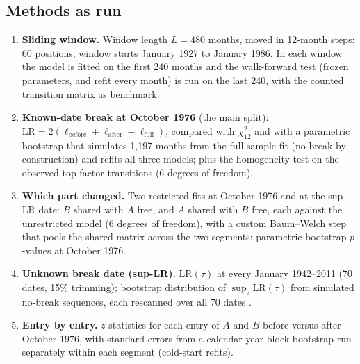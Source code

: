 \documentclass[11pt]{article}
\begin{document}
\subsection{Methods as run}
\begin{enumerate}
\item \textbf{Sliding window.} Window length $L=480$ months, moved in 12-month steps: 60 positions, window starts January 1927 to January 1986. In each window the model is fitted on the first 240 months and the walk-forward test (frozen parameters, and refit every month) is run on the last 240, with the counted transition matrix as benchmark.
\item \textbf{Known-date break at October 1976} (the main split): $\text{LR}=2(\ell_{\text{before}}+\ell_{\text{after}}-\ell_{\text{full}})$, compared with $\chi^2_{12}$ and with a parametric bootstrap that simulates 1{,}197 months from the full-sample fit (no break by construction) and refits all three models; plus the \citet{anderson1957} homogeneity test on the observed top-factor transitions (6 degrees of freedom).
\item \textbf{Which part changed.} Two restricted fits at October 1976 and at the sup-LR date: $B$ shared with $A$ free, and $A$ shared with $B$ free, each against the unrestricted model (6 degrees of freedom), with a custom Baum--Welch step that pools the shared matrix across the two segments; parametric-bootstrap $p$-values at October 1976.
\item \textbf{Unknown break date (sup-LR).} $\text{LR}(\tau)$ at every January 1942--2011 (70 dates, 15\% trimming); bootstrap distribution of $\sup_\tau \text{LR}(\tau)$ from simulated no-break sequences, each rescanned over all 70 dates \citep{andrews1993,hansen2000}.
\item \textbf{Entry by entry.} $z$-statistics for each entry of $A$ and $B$ before versus after October 1976, with standard errors from a calendar-year block bootstrap run separately within each segment (cold-start refits).
\end{enumerate}
\end{document}
